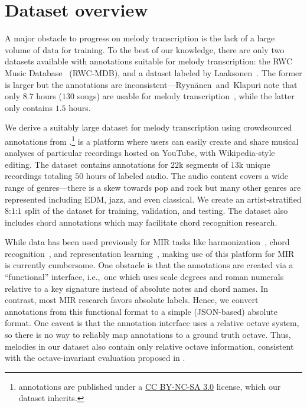 \vspace{-2mm}
\section{Dataset overview}
\label{sec:dataset}

A major obstacle to progress on melody transcription is the lack of a large volume of data for training. 
To the best of our knowledge, 
there are only two datasets available with annotations suitable for melody transcription: the RWC Music Database~\cite{goto2002rwc,goto2003rwc,goto2004development} (RWC-MDB), 
and a dataset labeled by Laaksonen~\cite{laaksonen2014automatic}. 
The former is larger but the annotations are inconsistent---Ryyn{\"a}nen~and~Klapuri note that only $8.7$ hours ($130$ songs) are usable for melody transcription~\cite{ryynanen2008automatic}, while the latter only contains $1.5$ hours. 

We derive a suitably large dataset for melody transcription using crowdsourced annotations from \hooktheory{}.\footnote{
\hooktheory{} annotations are published under a \href{https://creativecommons.org/licenses/by-nc-sa/3.0/}{CC BY-NC-SA 3.0} license, which our dataset inherits.
}
\hooktheory{} is a platform where users can easily create and share musical analyses of particular recordings hosted on YouTube, with Wikipedia-style editing. 
The dataset contains annotations for $22$k segments of $13$k unique recordings totaling $50$ hours of labeled audio. 
The audio content covers a wide range of genres---there is a skew towards pop and rock but many other genres are represented including EDM, jazz, and even classical. 
We create an artist-stratified $8$:$1$:$1$ split of the dataset for training, validation, and testing. 
The dataset also includes chord annotations which may facilitate chord recognition research.

While \hooktheory{} data has been used previously for MIR tasks like 
harmonization~\cite{chen2021surprisenet,yeh2021automatic}, 
chord recognition~\cite{jiang2019mirex}, and 
representation learning~\cite{jiang2020transformer}, 
making use of this platform for MIR is currently cumbersome. 
One obstacle is that the annotations are created via a ``functional'' interface, i.e.,~one which uses scale degrees and roman numerals relative to a key signature instead of absolute notes and chord names. 
In contrast, most MIR research favors absolute labels.
Hence, we convert annotations from this functional format to a simple (JSON-based) absolute format. 
One caveat is that the \hooktheory{} annotation interface uses a relative octave system, 
so there is no way to reliably map annotations to a ground truth octave.
Thus, melodies in our dataset also contain only relative octave information, consistent with the octave-invariant evaluation proposed in .
